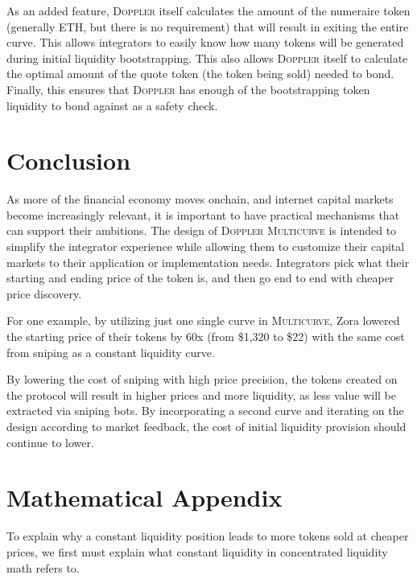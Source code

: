 \documentclass[sigconf,nonacm,prologue,table]{acmart}
\numberwithin{equation}{section}
\theoremstyle{definition}
\theoremstyle{remark}
\begin{document}
As an added feature, \textsc{Doppler} itself calculates the amount of the numeraire token (generally ETH, but there is no requirement) that will result in exiting the entire curve. This allows integrators to easily know how many tokens will be generated during initial liquidity bootstrapping. This also allows \textsc{Doppler} itself to calculate the optimal amount of the quote token (the token being sold) needed to bond. Finally, this ensures that \textsc{Doppler} has enough of the bootstrapping token liquidity to bond against as a safety check.

\section{Conclusion} 
\label{sec:users}

As more of the financial economy moves onchain, and internet capital markets become increasingly relevant, it is important to have practical mechanisms that can support their ambitions. The design of \textsc{Doppler Multicurve} is intended to simplify the integrator experience while allowing them to customize their capital markets to their application or implementation needs. Integrators pick what their starting and ending price of the token is, and then go end to end with cheaper price discovery. 

For one example, by utilizing just one single curve in \textsc{Multicurve}, Zora lowered the starting price of their tokens by 60x (from \$1,320 to \$22) with the same cost from sniping as a constant liquidity curve. 

By lowering the cost of sniping with high price precision, the tokens created on the protocol will result in higher prices and more liquidity, as less value will be extracted via sniping bots. By incorporating a second curve and iterating on the design according to market feedback, the cost of initial liquidity provision should continue to lower. 



\newpage

\appendix
\section{Mathematical Appendix} 
\label{sec:math}

To explain why a constant liquidity position leads to more tokens sold at cheaper prices, we first must explain what constant liquidity in concentrated liquidity math refers to. 
\end{document}
